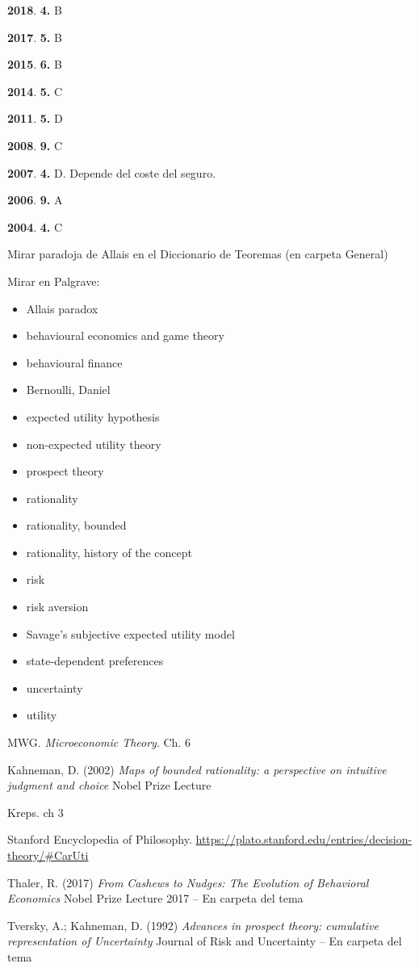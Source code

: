 \documentclass{nuevotema}
\begin{document}
\notas

\textbf{2018}. \textbf{4.} B

\textbf{2017}. \textbf{5.} B

\textbf{2015}. \textbf{6.} B

\textbf{2014}. \textbf{5.} C

\textbf{2011}. \textbf{5.} D

\textbf{2008}. \textbf{9.} C

\textbf{2007}. \textbf{4.} D. Depende del coste del seguro.

\textbf{2006}. \textbf{9.} A

\textbf{2004}. \textbf{4.} C

Mirar paradoja de Allais en el Diccionario de Teoremas (en carpeta General)


\bibliografia

Mirar en Palgrave:
\begin{itemize}
    \item Allais paradox
    \item behavioural economics and game theory
    \item behavioural finance
    \item Bernoulli, Daniel
    \item expected utility hypothesis
    \item non-expected utility theory
    \item prospect theory
    \item rationality
    \item rationality, bounded
    \item rationality, history of the concept
    \item risk
    \item risk aversion 
    \item Savage's subjective expected utility model
    \item state-dependent preferences
    \item uncertainty
    \item utility
\end{itemize}

MWG. \textit{Microeconomic Theory}. Ch. 6

Kahneman, D. (2002) \textit{Maps of bounded rationality: a perspective on intuitive judgment and choice} Nobel Prize Lecture

Kreps. ch 3

Stanford Encyclopedia of Philosophy. \url{https://plato.stanford.edu/entries/decision-theory/\#CarUti}

Thaler, R. (2017) \textit{From Cashews to Nudges: The Evolution of Behavioral Economics} Nobel Prize Lecture 2017 -- En carpeta del tema

Tversky, A.; Kahneman, D. (1992) \textit{Advances in prospect theory: cumulative representation of Uncertainty} Journal of Risk and Uncertainty -- En carpeta del tema
\end{document}
